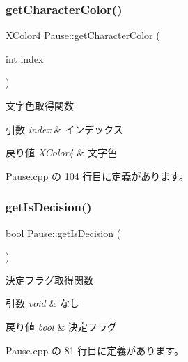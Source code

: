 \subsubsection{\texorpdfstring{get\+Character\+Color()}{getCharacterColor()}}
{\footnotesize\ttfamily \mbox{\hyperlink{_vector3_d_8h_a680c30c4a07d86fe763c7e01169cd6cc}{X\+Color4}} Pause\+::get\+Character\+Color (\begin{DoxyParamCaption}\item[{int}]{index }\end{DoxyParamCaption})}



文字色取得関数 


\begin{DoxyParams}{引数}
{\em index} & インデックス \\
\hline
\end{DoxyParams}

\begin{DoxyRetVals}{戻り値}
{\em X\+Color4} & 文字色 \\
\hline
\end{DoxyRetVals}


 Pause.\+cpp の 104 行目に定義があります。

\mbox{\label{class_pause_a31d255e4ec7bd216ec0eb5f3fc14dcac}} 
\subsubsection{\texorpdfstring{get\+Is\+Decision()}{getIsDecision()}}
{\footnotesize\ttfamily bool Pause\+::get\+Is\+Decision (\begin{DoxyParamCaption}{ }\end{DoxyParamCaption})}



決定フラグ取得関数 


\begin{DoxyParams}{引数}
{\em void} & なし \\
\hline
\end{DoxyParams}

\begin{DoxyRetVals}{戻り値}
{\em bool} & 決定フラグ \\
\hline
\end{DoxyRetVals}


 Pause.\+cpp の 81 行目に定義があります。

